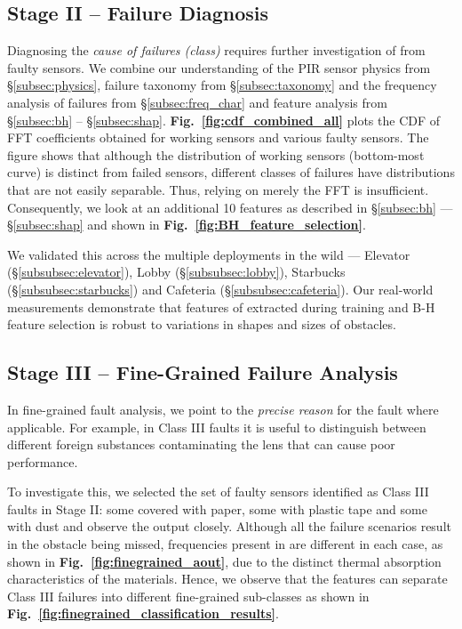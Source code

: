 \subsection{Stage II -- Failure Diagnosis}

Diagnosing the \textit{cause of failures (\ie class)} requires further investigation of \aout from faulty sensors.
We combine our understanding of the PIR sensor \ie physics from \S\ref{subsec:physics}, failure taxonomy from \S\ref{subsec:taxonomy} and the frequency analysis of failures from \S\ref{subsec:freq_char} and feature analysis from \S\ref{subsec:bh} -- \S\ref{subsec:shap}.
{\bfseries Fig.~\ref{fig:cdf_combined_all}} plots the CDF of FFT coefficients obtained for working sensors and various faulty sensors.
The figure shows that although the distribution of working sensors (bottom-most curve) is distinct from failed sensors, different classes of failures have distributions that are not easily separable.
Thus, relying on merely the FFT is insufficient.
Consequently, we look at an additional 10 features as described in \S\ref{subsec:bh} --- \S\ref{subsec:shap} and shown in {\bfseries Fig.~\ref{fig:BH_feature_selection}}.


We validated this across the multiple deployments in the wild --- Elevator (\S\ref{subsubsec:elevator}), Lobby (\S\ref{subsubsec:lobby}), Starbucks (\S\ref{subsubsec:starbucks}) and Cafeteria (\S\ref{subsubsec:cafeteria}).
Our real-world measurements demonstrate that features of \aout extracted during training and B-H feature selection is robust to variations in shapes and sizes of obstacles.

\subsection{Stage III -- Fine-Grained Failure Analysis} In fine-grained fault analysis, we point to the \textit{precise reason} for the fault where applicable. For example, in Class III faults it is useful to distinguish between different foreign substances contaminating the lens that can cause poor performance.


To investigate this, we selected the set of faulty sensors identified as Class III faults in Stage II: some covered with paper, some with plastic tape and some with dust and observe the \aout output closely. Although all the failure scenarios result in the obstacle being missed, frequencies present in \aout are different in each case, as shown in {\bfseries Fig.~\ref{fig:finegrained_aout}}, %
due to the distinct thermal absorption characteristics of the materials.
Hence, we observe that the \aout features can separate Class III failures into different fine-grained sub-classes as shown in {\bfseries Fig.~\ref{fig:finegrained_classification_results}}.

